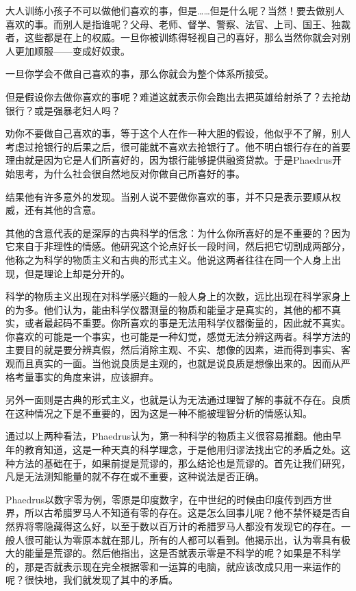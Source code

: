 \documentclass[UTF8]{article}
\begin{document}
\par 大人训练小孩子不可以做他们喜欢的事，但是……但是什么呢？当然！要去做别人喜欢的事。而别人是指谁呢？父母、老师、督学、警察、法官、上司、国王、独裁者，这些都是在上的权威。一旦你被训练得轻视自己的喜好，那么当然你就会对别人更加顺服——变成好奴隶。
\par 一旦你学会不做自己喜欢的事，那么你就会为整个体系所接受。
\par 但是假设你去做你喜欢的事呢？难道这就表示你会跑出去把英雄给射杀了？去抢劫银行？或是强暴老妇人吗？
\par 劝你不要做自己喜欢的事，等于这个人在作一种大胆的假设，他似乎不了解，别人考虑过抢银行的后果之后，很可能就不喜欢去抢银行了。他不明白银行存在的首要理由就是因为它是人们所喜好的，因为银行能够提供融资贷款。于是Phaedrus开始思考，为什么社会很自然地反对你做自己所喜好的事。
\par 结果他有许多意外的发现。当别人说不要做你喜欢的事，并不只是表示要顺从权威，还有其他的含意。
\par 其他的含意代表的是深厚的古典科学的信念：为什么你所喜好的是不重要的？因为它来自于非理性的情感。他研究这个论点好长一段时间，然后把它切割成两部分，他称之为科学的物质主义和古典的形式主义。他说这两者往往在同一个人身上出现，但是理论上却是分开的。
\par 科学的物质主义出现在对科学感兴趣的一般人身上的次数，远比出现在科学家身上的为多。他们认为，能由科学仪器测量的物质和能量才是真实的，其他的都不真实，或者最起码不重要。你所喜欢的事是无法用科学仪器衡量的，因此就不真实。你喜欢的可能是一个事实，也可能是一种幻觉，感觉无法分辨这两者。科学方法的主要目的就是要分辨真假，然后消除主观、不实、想像的因素，进而得到事实、客观而且真实的一面。当他说良质是主观的，也就是说良质是想像出来的。因而从严格考量事实的角度来讲，应该摒弃。
\par 另外一面则是古典的形式主义，也就是认为无法通过理智了解的事就不存在。良质在这种情况之下是不重要的，因为这是一种不能被理智分析的情感认知。
\par 通过以上两种看法，Phaedrus认为，第一种科学的物质主义很容易推翻。他由早年的教育知道，这是一种天真的科学理念，于是他用归谬法找出它的矛盾之处。这种方法的基础在于，如果前提是荒谬的，那么结论也是荒谬的。首先让我们研究，凡是无法测知能量的就不存在或不重要，这种说法是否正确。
\par Phaedrus以数字零为例，零原是印度数字，在中世纪的时候由印度传到西方世界，所以古希腊罗马人不知道有零的存在。这是怎么回事儿呢？他不禁怀疑是否自然界将零隐藏得这么好，以至于数以百万计的希腊罗马人都没有发现它的存在。一般人很可能认为零原本就在那儿，所有的人都可以看到。他揭示出，认为零具有极大的能量是荒谬的。然后他指出，这是否就表示零是不科学的呢？如果是不科学的，那是否就表示现在完全根据零和一运算的电脑，就应该改成只用一来运作的呢？很快地，我们就发现了其中的矛盾。
\end{document}

